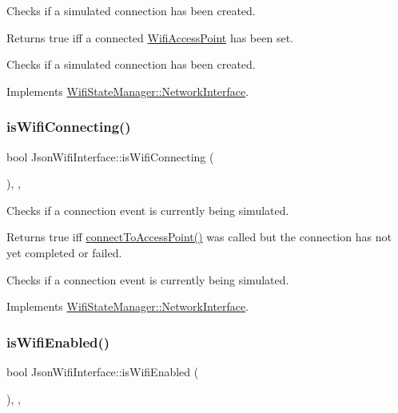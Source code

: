Checks if a simulated connection has been created.

\begin{DoxyReturn}{Returns}
true iff a connected \mbox{\hyperlink{classWifiAccessPoint}{Wifi\+Access\+Point}} has been set.
\end{DoxyReturn}
Checks if a simulated connection has been created. 

Implements \mbox{\hyperlink{classWifiStateManager_1_1NetworkInterface_a236b07174e3ab91973fce616746c0f70}{Wifi\+State\+Manager\+::\+Network\+Interface}}.

\mbox{\label{classJsonWifiInterface_ae39dde05b32eb35e755c79a947210dc4}} 
\subsubsection{\texorpdfstring{is\+Wifi\+Connecting()}{isWifiConnecting()}}
{\footnotesize\ttfamily bool Json\+Wifi\+Interface\+::is\+Wifi\+Connecting (\begin{DoxyParamCaption}{ }\end{DoxyParamCaption})\hspace{0.3cm}{\ttfamily [override]}, {\ttfamily [protected]}, {\ttfamily [virtual]}}

Checks if a connection event is currently being simulated.

\begin{DoxyReturn}{Returns}
true iff \mbox{\hyperlink{classJsonWifiInterface_aed57685bddc0a447976d86095d232cf5}{connect\+To\+Access\+Point()}} was called but the connection has not yet completed or failed.
\end{DoxyReturn}
Checks if a connection event is currently being simulated. 

Implements \mbox{\hyperlink{classWifiStateManager_1_1NetworkInterface_ade4c478d4b57628d39726f1b85a396f0}{Wifi\+State\+Manager\+::\+Network\+Interface}}.

\mbox{\label{classJsonWifiInterface_ab5b5756ab6c456dbf25d93233b237d40}} 
\subsubsection{\texorpdfstring{is\+Wifi\+Enabled()}{isWifiEnabled()}}
{\footnotesize\ttfamily bool Json\+Wifi\+Interface\+::is\+Wifi\+Enabled (\begin{DoxyParamCaption}{ }\end{DoxyParamCaption})\hspace{0.3cm}{\ttfamily [override]}, {\ttfamily [protected]}, {\ttfamily [virtual]}}

